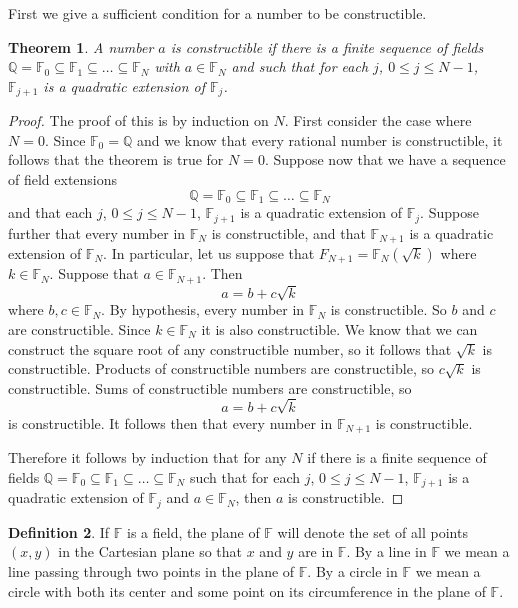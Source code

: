 \documentclass[11pt]{article}
\renewcommand\subset\subseteq
\newtheorem{theorem}{Theorem}[section]
\theoremstyle{definition}
\newtheorem{definition}[theorem]{Definition}
\begin{document}
First we give a sufficient condition for a number to be constructible.

\begin{theorem}
  A number $a$ is constructible if there is a finite sequence of fields $\mathbb{Q} = \mathbb{F}_0 \subset \mathbb{F}_1\subset \dots \subset \mathbb{F}_N$ with
  $a\in\mathbb{F}_N$ and such that for each $j$, $0\leq j \leq N-1$, $\mathbb{F}_{j+1}$ is a quadratic extension of $\mathbb{F}_j$.
  \label{theorem: constructible if in sequence of quadratic extensions}
\end{theorem}
\begin{proof}
  The proof of this is by induction on $N$. First consider the case where $N=0$. Since $\mathbb{F}_0=\mathbb{Q}$ and we know that every rational number
  is constructible, it follows that the theorem is true for $N=0$. Suppose now that we have a sequence of field extensions
  \[ \mathbb{Q} = \mathbb{F}_0 \subset \mathbb{F}_1\subset \dots \subset \mathbb{F}_N \]
  and that each $j$, $0\leq j \leq N-1$, $\mathbb{F}_{j+1}$ is a quadratic extension of $\mathbb{F}_j$. Suppose further that
  every number in $\mathbb{F}_N$ is constructible, and that $\mathbb{F}_{N+1}$ is a quadratic extension of $\mathbb{F}_N$. In particular, let us suppose that
  $F_{N+1}=\mathbb{F}_N(\sqrt{k})$ where $k \in \mathbb{F}_N$. Suppose that $a \in \mathbb{F}_{N+1}$. Then 
  \[ a = b + c\sqrt{k}\]
  where $b,c\in\mathbb{F}_N$. By hypothesis, every number in $\mathbb{F}_N$ is constructible. So $b$ and $c$ are constructible. Since $k\in\mathbb{F}_N$ it is also
  constructible. We know that we can construct the square root of any constructible number, so it follows that $\sqrt{k}$ is constructible. Products of
  constructible numbers are constructible, so $c\sqrt{k}$ is constructible. Sums of constructible numbers are constructible, so 
  \[ a = b + c\sqrt{k} \]
  is constructible. It follows then that every number in $\mathbb{F}_{N+1}$ is constructible. 
  
  Therefore it follows by induction that for any $N$ if there is a finite sequence of fields 
  $\mathbb{Q} = \mathbb{F}_0 \subset \mathbb{F}_1\subset \dots \subset \mathbb{F}_N$ 
  such that for each $j$, $0\leq j \leq N-1$, $\mathbb{F}_{j+1}$ is a quadratic extension of $\mathbb{F}_j$ and $a\in\mathbb{F}_N$, then $a$ is constructible. 
\end{proof}

\begin{definition}
  If $\mathbb{F}$ is a field, the plane of $\mathbb{F}$ will denote the set of all points $(x,y)$ in the Cartesian plane so that $x$ and $y$ are 
  in $\mathbb{F}$. By a line in $\mathbb{F}$ we mean a line passing through two points in the plane of $\mathbb{F}$. By a circle in $\mathbb{F}$ we 
  mean a circle with both its center and some point on its circumference in the plane of $\mathbb{F}$.
\end{definition}
\end{document}
